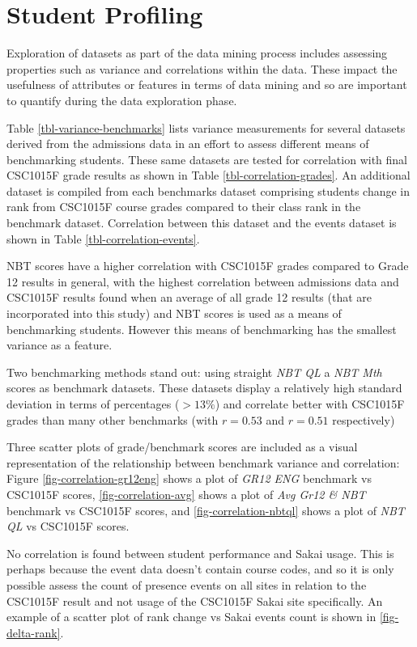 \section{Student Profiling}
Exploration of datasets as part of the data mining process includes assessing properties such as variance and correlations within the data. These impact the usefulness of attributes or features in terms of data mining and so are important to quantify during the data exploration phase.

Table \ref{tbl-variance-benchmarks} lists variance measurements for several datasets derived from the admissions data in an effort to assess different means of benchmarking students. These same datasets are tested for correlation with final CSC1015F grade results as shown in Table \ref{tbl-correlation-grades}. An additional dataset is compiled from each benchmarks dataset comprising students change in rank from CSC1015F course grades compared to their class rank in the benchmark dataset. Correlation between this dataset and the events dataset is shown in Table \ref{tbl-correlation-events}.





NBT scores have a higher correlation with CSC1015F grades compared to Grade 12 results in general, with the highest correlation between admissions data and CSC1015F results found when an average of all grade 12 results (that are incorporated into this study) and NBT scores is used as a means of benchmarking students. However this means of benchmarking has the smallest variance as a feature.

Two benchmarking methods stand out: using straight \textit{NBT QL} a \textit{NBT Mth} scores as benchmark datasets. These datasets display a relatively high standard deviation in terms of percentages ($> 13\%$) and correlate better with CSC1015F grades than many other benchmarks (with $r = 0.53$ and $r = 0.51$ respectively)

Three scatter plots of grade/benchmark scores are included as a visual representation of the relationship between benchmark variance and correlation: Figure \ref{fig-correlation-gr12eng} shows a plot of \textit{GR12 ENG} benchmark vs CSC1015F scores, \ref{fig-correlation-avg} shows a plot of \textit{Avg Gr12 \& NBT} benchmark vs CSC1015F scores, and \ref{fig-correlation-nbtql} shows a plot of \textit{NBT QL} vs CSC1015F scores.

No correlation is found between student performance and Sakai usage. This is perhaps because the event data doesn't contain course codes, and so it is only possible assess the count of presence events on all sites in relation to the CSC1015F result and not usage of the CSC1015F Sakai site specifically. An example of a scatter plot of rank change vs Sakai events count is shown in \ref{fig-delta-rank}.




